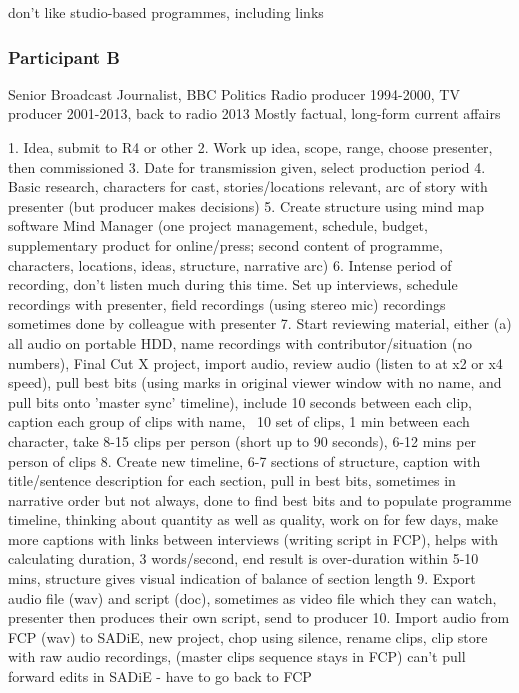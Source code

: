 don't like studio-based programmes, including links

\subsubsection{Participant B}
Senior Broadcast Journalist, BBC Politics
Radio producer 1994-2000, TV producer 2001-2013, back to radio 2013
Mostly factual, long-form current affairs 

1. Idea, submit to R4 or other
2. Work up idea, scope, range, choose presenter, then commissioned
3. Date for transmission given, select production period
4. Basic research, characters for cast, stories/locations relevant, arc of
story with presenter (but producer makes decisions)
5. Create structure using mind map software Mind Manager (one project
management, schedule, budget, supplementary product for online/press; second
content of programme, characters, locations, ideas, structure, narrative arc)
6. Intense period of recording, don't listen much during this time. Set up
interviews, schedule recordings with presenter, field recordings (using stereo
mic) recordings sometimes done by colleague with presenter
7. Start reviewing material, either (a) all audio on portable HDD, name
recordings with contributor/situation (no numbers), Final Cut X project, import
audio, review audio (listen to at x2 or x4 speed), pull best bits (using marks
in original viewer window with no name, and pull bits onto 'master sync'
timeline), include 10 seconds between each clip, caption each group of clips
with name, ~10 set of clips, 1 min between each character, take 8-15 clips per
person (short up to 90 seconds), 6-12 mins per person of clips
8. Create new timeline, 6-7 sections of structure, caption with title/sentence
description for each section, pull in best bits, sometimes in narrative order
but not always, done to find best bits and to populate programme timeline,
thinking about quantity as well as quality, work on for few days, make more
captions with links between interviews (writing script in FCP), helps with
calculating duration, 3 words/second, end result is over-duration within 5-10
mins, structure gives visual indication of balance of section length
9. Export audio file (wav) and script (doc), sometimes as video file which they
can watch, presenter then produces their own script, send to producer
10. Import audio from FCP (wav) to SADiE, new project, chop using silence,
rename clips, clip store with raw audio recordings, (master clips sequence
stays in FCP) can't pull forward edits in SADiE - have to go back to FCP
